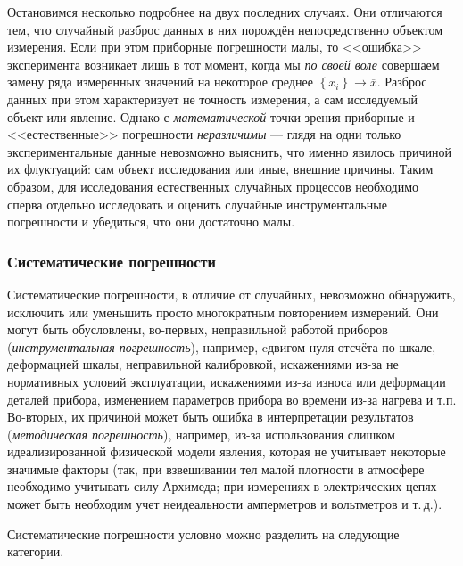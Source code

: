Остановимся несколько подробнее на двух последних случаях. Они отличаются
тем, что случайный разброс данных в них порождён непосредственно объектом
измерения. Если при этом приборные погрешности малы, то <<ошибка>>
эксперимента возникает лишь в тот момент, когда мы \emph{по своей
воле} совершаем замену ряда измеренных значений на некоторое среднее
$\left\{ x_{i}\right\} \to\overline{x}$. Разброс данных при этом
характеризует не точность измерения, а сам исследуемый объект или
явление. Однако с \emph{математической} точки зрения приборные и <<естественные>>
погрешности \emph{неразличимы} --- глядя на одни только
экспериментальные данные невозможно выяснить, что именно явилось причиной
их флуктуаций: сам объект исследования или иные, внешние причины.
Таким образом, для исследования естественных случайных процессов необходимо
сперва отдельно исследовать и оценить случайные инструментальные погрешности
и убедиться, что они достаточно малы.


\subsubsection{Систематические погрешности}

Систематические погрешности, в отличие от случайных, невозможно обнаружить,
исключить или уменьшить просто многократным повторением измерений.
Они могут быть обусловлены, во-первых, неправильной работой приборов
(\emph{инструментальная погрешность}), например, cдвигом нуля отсчёта
по шкале, деформацией шкалы, неправильной калибровкой, искажениями
из-за не нормативных условий эксплуатации, искажениями из-за износа
или деформации деталей прибора, изменением параметров прибора во времени
из-за нагрева и т.п. Во-вторых, их причиной может быть ошибка в интерпретации
результатов (\emph{методическая погрешность}), например, из-за использования
слишком идеализированной физической модели явления, которая не учитывает
некоторые значимые факторы (так, при взвешивании тел малой плотности
в атмосфере необходимо учитывать силу Архимеда; при измерениях в электрических
цепях может быть необходим учет неидеальности амперметров и вольтметров
и т.\,д.).

Систематические погрешности условно можно разделить на следующие категории.

